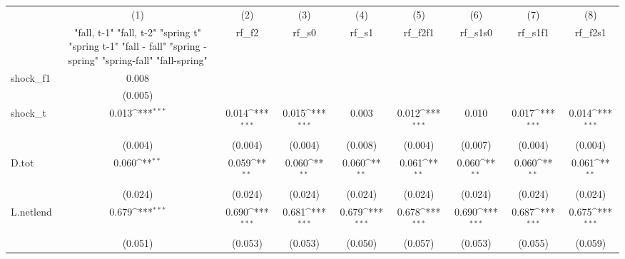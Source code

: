 {
\def\sym#1{\ifmmode^{#1}\else\(^{#1}\)\fi}
\begin{tabular}{l*{8}{c}}
\toprule
            &\multicolumn{1}{c}{(1)}&\multicolumn{1}{c}{(2)}&\multicolumn{1}{c}{(3)}&\multicolumn{1}{c}{(4)}&\multicolumn{1}{c}{(5)}&\multicolumn{1}{c}{(6)}&\multicolumn{1}{c}{(7)}&\multicolumn{1}{c}{(8)}\\
            &\multicolumn{1}{c}{  "fall, t-1" "fall, t-2" "spring t" "spring t-1"  "fall - fall" "spring - spring" "spring-fall" "fall-spring" }&\multicolumn{1}{c}{rf\_f2}&\multicolumn{1}{c}{rf\_s0}&\multicolumn{1}{c}{rf\_s1}&\multicolumn{1}{c}{rf\_f2f1}&\multicolumn{1}{c}{rf\_s1s0}&\multicolumn{1}{c}{rf\_s1f1}&\multicolumn{1}{c}{rf\_f2s1}\\
\midrule
shock\_f1    &       0.008         &                     &                     &                     &                     &                     &                     &                     \\
            &     (0.005)         &                     &                     &                     &                     &                     &                     &                     \\
\addlinespace
shock\_t     &       0.013\sym{***}&       0.014\sym{***}&       0.015\sym{***}&       0.003         &       0.012\sym{***}&       0.010         &       0.017\sym{***}&       0.014\sym{***}\\
            &     (0.004)         &     (0.004)         &     (0.004)         &     (0.008)         &     (0.004)         &     (0.007)         &     (0.004)         &     (0.004)         \\
\addlinespace
D.tot       &       0.060\sym{**} &       0.059\sym{**} &       0.060\sym{**} &       0.060\sym{**} &       0.061\sym{**} &       0.060\sym{**} &       0.060\sym{**} &       0.061\sym{**} \\
            &     (0.024)         &     (0.024)         &     (0.024)         &     (0.024)         &     (0.024)         &     (0.024)         &     (0.024)         &     (0.024)         \\
\addlinespace
L.netlend   &       0.679\sym{***}&       0.690\sym{***}&       0.681\sym{***}&       0.679\sym{***}&       0.678\sym{***}&       0.690\sym{***}&       0.687\sym{***}&       0.675\sym{***}\\
            &     (0.051)         &     (0.053)         &     (0.053)         &     (0.050)         &     (0.057)         &     (0.053)         &     (0.055)         &     (0.059)         \\

\end{tabular}}
